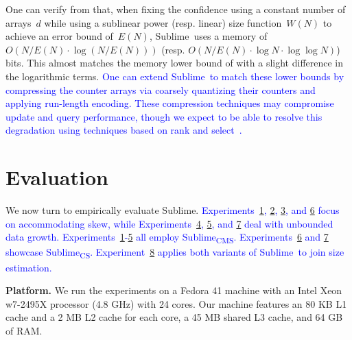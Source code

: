 \documentclass[sigconf]{acmart}
\newcommand{\sketch}{Sublime}
\newcommand{\sketchcms}{\sketch\textsubscript{CMS}\xspace}
\newcommand{\sketchcs}{\sketch\textsubscript{CS}\xspace}
\begin{document}
One can verify from  that, when
fixing the confidence using a constant number of arrays~$d$ while using a
sublinear power (resp. linear) size function~$W(N)$ to achieve an error bound
of~$E(N)$, \sketch\ uses a memory of~$O(N/E(N) \cdot \log (N/E(N)))$ (resp.
$O(N/E(N) \cdot \log N \cdot \log\log N)$) bits. This almost matches the memory
lower bound of 
with a slight difference in the logarithmic
terms. \textcolor{blue}{One can extend \sketch\ to match these lower bounds by
compressing the counter arrays via coarsely quantizing their counters and
applying run-length encoding. These compression techniques may compromise
update and query performance, though we expect to be able to resolve this
degradation using techniques based on rank and
select~\cite{Poppy,FlorianRankandSelect,CompactPATTrees,RankandSelectDict,Succincter}.}

\section{Evaluation}\label{sec:evaluation}
We now turn to empirically evaluate \sketch.
\textcolor{blue}{Experiments~\hyperlink{experiment:accuracy}{1},
\hyperlink{experiment:skew}{2}, \hyperlink{experiment:vale_tuning}{3}, and
\hyperlink{experiment:vale_tuning}{6} focus on accommodating skew, while
Experiments~\hyperlink{experiment:expansion}{4},
\hyperlink{experiment:contraction}{5}, and
\hyperlink{experiment:l2_size_function}{7} deal with unbounded data growth.
Experiments~\hyperlink{experiment:accuracy}{1}-\hyperlink{experiment:contraction}{5}
all employ \sketchcms. Experiments~\hyperlink{experiment:arruacy_unbiased}{6}
and \hyperlink{experiment:l2_size_function}{7} showcase \sketchcs.
Experiment~\hyperlink{experiment:join_size}{8} applies both variants of
\sketch\ to join size estimation.}

\textbf{Platform.}
We run the experiments on a Fedora 41 machine with an Intel Xeon w7-2495X
processor (4.8 GHz) with 24 cores. Our machine features an 80 KB L1 cache and a
2 MB L2 cache for each core, a 45 MB shared L3 cache, and 64 GB of RAM.
\end{document}
